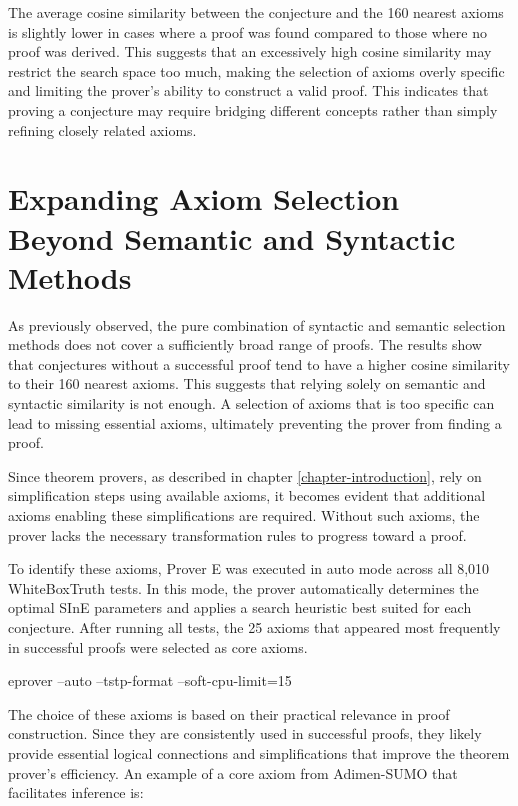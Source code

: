 \documentclass[english,version-2020-11]{uzl-thesis}
\begin{document}
The average cosine similarity between the conjecture and the 160 nearest axioms is slightly lower in cases where a proof was found compared to those where no proof was derived. This suggests that an excessively high cosine similarity may restrict the search space too much, making the selection of axioms overly specific and limiting the prover's ability to construct a valid proof. This indicates that proving a conjecture may require bridging different concepts rather than simply refining closely related axioms.


\section{Expanding Axiom Selection Beyond Semantic and Syntactic Methods}

As previously observed, the pure combination of syntactic and semantic selection methods does not cover a sufficiently broad range of proofs. The results show that conjectures without a successful proof tend to have a higher cosine similarity to their 160 nearest axioms. This suggests that relying solely on semantic and syntactic similarity is not enough. A selection of axioms that is too specific can lead to missing essential axioms, ultimately preventing the prover from finding a proof.

Since theorem provers, as described in chapter \ref{chapter-introduction}, rely on simplification steps using available axioms, it becomes evident that additional axioms enabling these simplifications are required. Without such axioms, the prover lacks the necessary transformation rules to progress toward a proof.

To identify these axioms, Prover E was executed in auto mode across all 8,010 WhiteBoxTruth tests. In this mode, the prover automatically determines the optimal SInE parameters and applies a search heuristic best suited for each conjecture. After running all tests, the 25 axioms that appeared most frequently in successful proofs were selected as core axioms.

\begin{Pseudocode}[morekeywords = {add, create}, deletekeywords={to}, numbers=left,
    caption = {Prover E configuration}]
    eprover --auto --tstp-format --soft-cpu-limit=15
\end{Pseudocode}


The choice of these axioms is based on their practical relevance in proof construction. Since they are consistently used in successful proofs, they likely provide essential logical connections and simplifications that improve the theorem prover's efficiency.
\newpage
An example of a core axiom from Adimen-SUMO that facilitates inference is:
\end{document}
